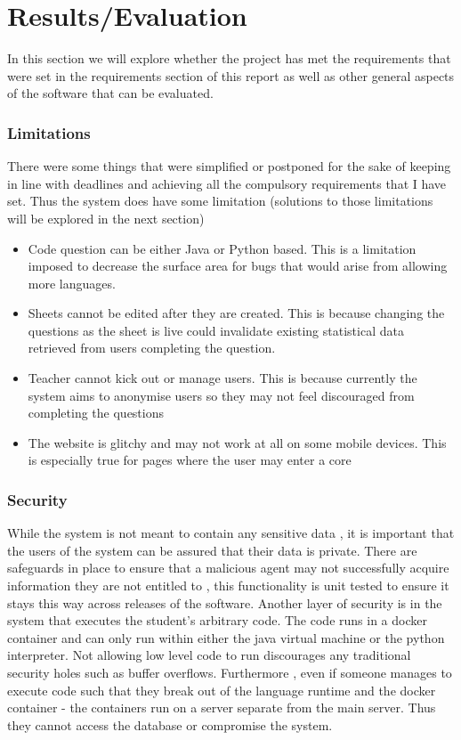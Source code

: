 \chapter{Results/Evaluation}

In this section we will explore whether the project has met the requirements that were set in the requirements section of this report as well as other general aspects of the software that can be evaluated.



\subsection{Limitations}
There were some things that were simplified or postponed for the sake of keeping in line with deadlines and achieving all the compulsory requirements that I have set. Thus the system does have some limitation (solutions to those limitations will be explored in the next section)

\begin{itemize}
	\item Code question can be either Java or Python based. This is a limitation imposed to decrease the surface area for bugs that would arise from allowing more languages.
	\item Sheets cannot be edited after they are created. This is because changing the questions as the sheet is live could invalidate existing statistical data retrieved from users completing the question.
	\item Teacher cannot kick out or manage users. This is because currently the system aims to anonymise users so they may not feel discouraged from completing the questions
	\item The website is glitchy and may not work at all on some mobile devices. This is especially true for pages where the user may enter a core
\end{itemize}

\subsection{Security}
While the system is not meant to contain any sensitive data , it is important that the users of the system can be assured that their data is private. 
There are safeguards in place to ensure that a malicious agent may not successfully acquire information they are not entitled to , this functionality is unit tested to ensure it stays this way across releases of the software.
Another layer of security is in the system that executes the student's arbitrary code.
The code runs in a docker container and can only run within either the java virtual machine or the python interpreter. Not allowing low level code to run discourages any traditional security holes such as buffer overflows.
Furthermore , even if someone manages to execute code such that they break out of the language runtime and the docker container - the containers run on a server separate from the main server. Thus they cannot access the database or compromise the system.

